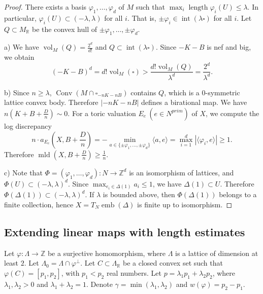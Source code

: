 \documentclass[12pt,twoside]{amsart}
\newcommand{\Z}{{\mathbb Z}}
\newcommand{\R}{{\mathbb R}}
\newcommand{\Conv}{\operatorname{Conv}}
\newcommand{\emb}{\operatorname{emb}}
\newcommand{\Int}{\operatorname{int}}
\newcommand{\length}{\operatorname{length}}
\newcommand{\mld}{\operatorname{mld}}
\newcommand{\vol}{\operatorname{vol}}
\theoremstyle{plain}
\theoremstyle{definition}
\theoremstyle{remark}
\begin{document}
\begin{proof}
	There exists a basis $\varphi_1,\ldots,\varphi_d$ of $M$ such that $\max_i\length \varphi_i(U) \le \lambda$. 
	In particular, $\varphi_i(U) \subset  (-\lambda,\lambda)$ for all $i$. That is, $\pm \varphi_i\in \Int(\lambda\square)$ for all $i$. 
	Let $Q\subset M_\R$ be the convex hull of $\pm \varphi_1,\ldots,\pm \varphi_d$. 
	
	a) We have $\vol_M(Q)=\frac{2^d}{d!}$ and $Q\subset \Int(\lambda \square)$. Since $-K-B$ is nef and big, we obtain
	$$
	(-K-B)^d=d!\vol_M(\square)>\frac{d!\vol_M(Q)}{\lambda^d}=\frac{2^d}{\lambda^d}.
	$$
	
	b) Since $n\ge \lambda$, $\Conv(M\cap \square_{-nK-nB})$
	contains $Q$, which is a $0$-symmetric lattice convex body. Therefore
	$|-nK-nB|$ defines a birational map. We have $n(K+B+\frac{D}{n})\sim 0$. 
	For a toric valuation $E_e\ (e\in N^{prim})$ of $X$, we compute the log discrepancy
	$$
	 n\cdot a_{E_e}(X,B+\frac{D}{n})=-\min_{a\in \{\pm \varphi_1,\ldots,\pm \varphi_d\} }  \langle a,e\rangle  =
	\max_{i=1}^d|\langle \varphi_i,e\rangle|\ge 1.
	$$
	Therefore $\mld(X,B+\frac{D}{n})\ge \frac{1}{n}$.
	
	c) Note that $\Phi=(\varphi_1,\ldots,\varphi_d)\colon N\to \Z^d$ is an isomorphism of lattices, and $\Phi(U)\subset  (-\lambda,\lambda)^d$. Since $\max_{e_i \in \Delta(1)}a_i\le 1$,
	we have $\Delta(1)\subset U$. Therefore $\Phi(\Delta(1))\subset (-\lambda ,\lambda)^d$.
	If $\lambda$ is bounded above, then $\Phi(\Delta(1))$ belongs to a finite collection, hence 
	$X=T_N\emb(\Delta)$ is finite up to isomorphism.
\end{proof}


\subsection{Extending linear maps with length estimates}


	Let $\varphi\colon \Lambda\to \Z$ be a surjective homomorphism, where $\Lambda$ is a lattice of dimension at least $2$. 
	Let $\Lambda_0=\Lambda\cap \varphi^\perp$. Let $C\subset \Lambda_\R$ be a closed convex set such that $\varphi(C)=[p_1,p_2]$, with $p_1<p_2$ real numbers. Let $p=\lambda_1p_1+\lambda_2p_2$, where $\lambda_1,\lambda_2>0$ and $\lambda_1+\lambda_2=1$. Denote $\gamma=\min(\lambda_1,\lambda_2)$ and $w(\varphi)=p_2-p_1$.
	
\end{document}
